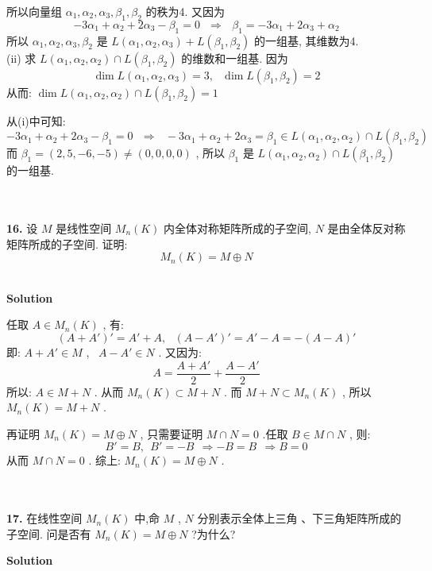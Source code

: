 \documentclass[11pt,a4paper,openany,oneside]{book}
\newcommand\Solution{\noindent\textbf{\textsf{Solution}}\par\medskip}
\begin{document}
所以向量组 $ \alpha_1, \alpha_2, \alpha_3, \beta_1, \beta_2 $ 的秩为4. 又因为
 $$   -3\alpha_1 + \alpha_2 + 2\alpha_3 -\beta_1 = 0 \ \ \ \Rightarrow \ \ \ \beta_1 = -3\alpha_1 + 2\alpha_3 + \alpha_2  $$ 
所以 $ \alpha_1, \alpha_2, \alpha_3, \beta_2 $ 是 $ L(\alpha_1, \alpha_2, \alpha_3) + L(\beta_1, \beta_2) $ 的一组基, 其维数为4.  \\

(ii) 求 $ L(\alpha_1, \alpha_2, \alpha_2) \cap L(\beta_1, \beta_2) $ 的维数和一组基. 因为
 $$  \dim L(\alpha_1, \alpha_2, \alpha_3) = 3, \ \ \ \dim L(\beta_1, \beta_2) = 2  $$ 
从而:  $ \dim L(\alpha_1, \alpha_2, \alpha_2) \cap L(\beta_1, \beta_2) = 1 $ 

从(i)中可知:
 $$  -3\alpha_1 + \alpha_2 + 2\alpha_3 -\beta_1 = 0 \ \ \ \Rightarrow \ \ \ -3\alpha_1 + \alpha_2 + 2\alpha_3 = \beta_1 \in L(\alpha_1, \alpha_2, \alpha_2) \cap L(\beta_1, \beta_2)  $$ 
\hspace{3.3em} 而  $ \beta_1 = (2, 5, -6, -5) \neq (0, 0, 0, 0) $ , 所以 $ \beta_1 $ 是 $ L(\alpha_1, \alpha_2, \alpha_2) \cap L(\beta_1, \beta_2) $ 的一组基.  \\  \\  \\



\begin{myexample}
	\textbf{16.} 
设 $ M $ 是线性空间 $ M_n(K) $ 内全体对称矩阵所成的子空间,  $ N $ 是由全体反对称矩阵所成的子空间. 证明:
 $$  M_n(K) = M \oplus  N  $$    \\  

\end{myexample}
\Solution

任取 $ A \in M_n(K) $ , 有:
 $$  (A + A')' = A' + A , \ \ \ (A - A')' = A' - A  = -(A - A)'   $$ 
\hspace{3em} 即:  $ A + A' \in M $ , \  $ A - A' \in N $ . 又因为:
 $$  A = \dfrac{A+A'}{2} + \dfrac{A - A'}{2}  $$ 
所以: $ A \in M + N $ . 从而 $ M_n(K) \subset M + N $ . 而 $ M + N \subset M_n(K) $ , 所以  $ M_n(K) = M + N $ . 

再证明 $ M_n(K) = M \oplus  N $ , 只需要证明 $ M \cap N = 0 $ .任取 $ B \in M \cap N $ , 则:
 $$  B' = B, \ \ B' = -B \ \ \Rightarrow -B = B \ \ \Rightarrow B = 0  $$ 
\hspace{3em} 从而 $ M \cap N = 0 $ . 综上:  $ M_n(K) = M \oplus  N $ .  \\  \\ \\


\begin{myexample}
	\textbf{17.} 
在线性空间 $ M_n(K) $ 中,命 $ M $ ,  $ N $ 分别表示全体上三角 、下三角矩阵所成的子空间. 问是否有 $ M_n(K) = M \oplus  N $ ?为什么?   \\ 

\end{myexample}
\Solution
\end{document}
